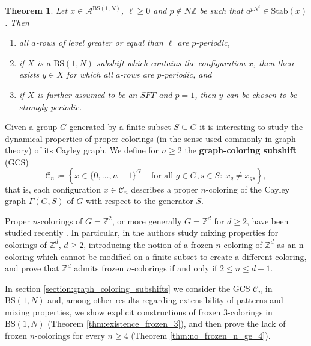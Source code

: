 \documentclass[letterpaper,10pt]{amsart}
\theoremstyle{plain}
\newtheorem{theorem}{Theorem}[section]
\newcommand{\BS}[1][N]{\mathrm{BS}(1,#1)}
\begin{document}
		\begin{theorem}\label{thm:summary_weak_periodicity}
			Let $x\in \mathcal{A}^{\BS}$, $\ell\ge 0$ and $p\notin N\mathbb{Z}$ be such that $a^{pN^{\ell}}\in \mathrm{Stab}(x)$. Then
			\begin{enumerate}
				\item all $a$-rows of level greater or equal than $\ell$ are $p$-periodic,
				\item if $X$ is a $\BS$-subshift which contains the configuration $x$, then there exists $y\in X$ for which all $a$-rows are $p$-periodic, and 
				\item if $X$ is further assumed to be an $SFT$ and $p=1$, then $y$ can be chosen to be strongly periodic.
			\end{enumerate}
		\end{theorem}

Given a group $G$ generated by a finite subset $S\subseteq G$ it is interesting to study the dynamical properties of proper colorings (in the sense used commonly in graph theory) of its Cayley graph. We define for $n\ge 2$ the \textbf{graph-coloring subshift} (GCS)
$$
\mathcal{C}_{n}\coloneqq\left\{x\in \{0,\ldots,n-1\}^G\mid \text{ for all } g\in G, s\in S: \ x_{g}\neq x_{gs} \right\},
$$
that is, each configuration $x\in \mathcal{C}_{n}$ describes a proper $n$-coloring of the Cayley graph $\Gamma(G,S)$ of $G$ with respect to the generator $S$. 

Proper $n$-colorings of $G=\mathbb{Z}^2$, or more generally $G=\mathbb{Z}^d$ for $d\ge 2$, have been studied recently \cite{alon2019mixing, peled2018rigidity, ray2020proper}. In particular, in \cite{alon2019mixing} the authors study mixing properties for colorings of $\mathbb{Z}^d$, $d\ge 2$, introducing the notion of a frozen $n$-coloring of $\mathbb{Z}^d$ as an n-coloring which cannot be modified on a finite subset to create a different coloring, and prove that $\mathbb{Z}^d$ admits frozen $n$-colorings if and only if $2\le n\le d+1$. 


In section \ref{section:graph_coloring_subshifts} we consider the GCS $\mathcal{C}_n$ in $\BS$ and, among other results regarding extensibility of patterns and mixing properties, we show explicit constructions of frozen $3$-colorings in $\BS$ (Theorem \ref{thm:existence_frozen_3}), and then prove the lack of frozen $n$-colorings for every $n\ge 4$ (Theorem \ref{thm:no_frozen_n_ge_4}).
\end{document}
